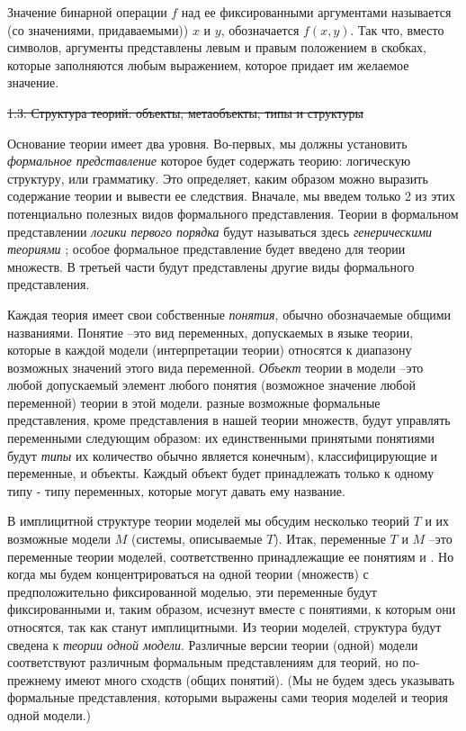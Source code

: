 Значение бинарной операции $f$ над ее фиксированными аргументами называется (со значениями, придаваемыми)) $x$ и $y$, обозначается $f(x,y)$. 
Так что, вместо символов, аргументы представлены левым и правым положением в скобках, которые заполняются любым выражением, которое придает им желаемое значение. 


\st {1.3. Структура теорий: объекты, метаобъекты, типы и структуры}

Основание теории имеет два уровня. Во-первых, мы должны установить {\it формальное представление} которое будет содержать теорию: логическую структуру, или грамматику. Это определяет, каким образом можно выразить содержание теории и вывести ее следствия. Вначале, мы введем только 2 из этих потенциально полезных видов формального представления. Теории в формальном представлении {\it логики первого порядка} будут называться здесь {\it генерическими теориями} ; особое формальное представление будет введено для теории множеств. В третьей части будут представлены другие виды формального представления. 

Каждая теория имеет свои собственные {\it понятия}, обычно обозначаемые общими названиями. Понятие –это вид переменных, допускаемых в языке теории, которые в каждой модели (интерпретации теории) относятся к диапазону возможных значений этого вида переменной. 
{\it Объект} теории в модели –это любой допускаемый элемент любого понятия (возможное значение любой переменной) теории в этой модели. 
разные возможные формальные представления, кроме представления в нашей теории множеств, будут управлять переменными следующим образом: их единственными принятыми понятиями будут {\it типы} их количество обычно является конечным), классифицирующие и переменные, и объекты. Каждый объект будет принадлежать только к одному типу - типу переменных, которые могут давать ему название. 

 В имплицитной структуре теории моделей мы обсудим несколько теорий $T$ и их возможные модели $M$ (системы, описываемые $T$). Итак, переменные $T$ и  $M$ –это переменные теории моделей, соответственно принадлежащие ее понятиям  и . Но когда мы будем концентрироваться на одной теории (множеств) с предположительно фиксированной моделью, эти переменные будут фиксированными и, таким образом, исчезнут вместе с понятиями, к которым они относятся, так как станут имплицитными. Из теории моделей, структура будут сведена к {\it теории одной модели}. 
 Различные версии теории (одной) модели соответствуют различным формальным представлениям для теорий, но по-прежнему имеют много сходств (общих понятий). (Мы не будем здесь указывать формальные представления, которыми выражены сами теория моделей и теория одной модели.)


